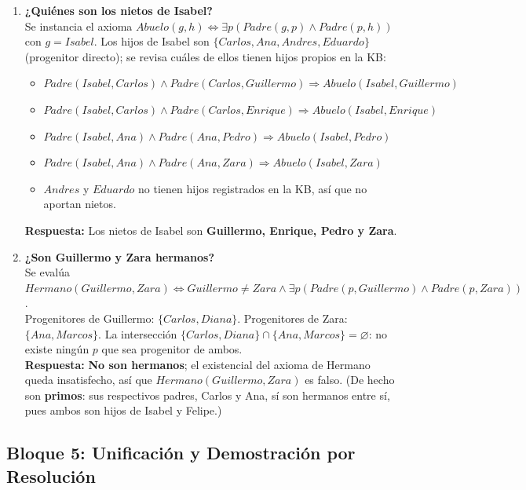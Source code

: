 \begin{enumerate}
    \item \textbf{¿Quiénes son los nietos de Isabel?}\\
    Se instancia el axioma $Abuelo(g,h) \Leftrightarrow \exists p(Padre(g,p)\land Padre(p,h))$ con
    $g=Isabel$. Los hijos de Isabel son $\{Carlos, Ana, Andres, Eduardo\}$ (progenitor directo); se
    revisa cuáles de ellos tienen hijos propios en la KB:
    \begin{itemize}
        \item $Padre(Isabel,Carlos) \land Padre(Carlos,Guillermo) \Rightarrow Abuelo(Isabel,Guillermo)$
        \item $Padre(Isabel,Carlos) \land Padre(Carlos,Enrique) \Rightarrow Abuelo(Isabel,Enrique)$
        \item $Padre(Isabel,Ana) \land Padre(Ana,Pedro) \Rightarrow Abuelo(Isabel,Pedro)$
        \item $Padre(Isabel,Ana) \land Padre(Ana,Zara) \Rightarrow Abuelo(Isabel,Zara)$
        \item $Andres$ y $Eduardo$ no tienen hijos registrados en la KB, así que no aportan nietos.
    \end{itemize}
    \textbf{Respuesta:} Los nietos de Isabel son \textbf{Guillermo, Enrique, Pedro y Zara}.

    \item \textbf{¿Son Guillermo y Zara hermanos?}\\
    Se evalúa $Hermano(Guillermo,Zara) \Leftrightarrow Guillermo\neq Zara \land \exists p
    (Padre(p,Guillermo)\land Padre(p,Zara))$.\\
    Progenitores de Guillermo: $\{Carlos, Diana\}$. Progenitores de Zara: $\{Ana, Marcos\}$.
    La intersección $\{Carlos,Diana\}\cap\{Ana,Marcos\} = \varnothing$: no existe ningún $p$ que sea
    progenitor de ambos.\\
    \textbf{Respuesta:} \textbf{No son hermanos}; el existencial del axioma de Hermano queda
    insatisfecho, así que $Hermano(Guillermo,Zara)$ es falso. (De hecho son \textbf{primos}: sus
    respectivos padres, Carlos y Ana, sí son hermanos entre sí, pues ambos son hijos de Isabel y
    Felipe.)
\end{enumerate}

\subsection{Bloque 5: Unificación y Demostración por Resolución}

